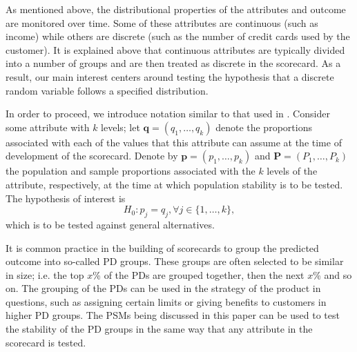 \documentclass{article}
\theoremstyle{def}
\begin{document}
As mentioned above, the distributional properties of the attributes and outcome are monitored over time. Some of these attributes are continuous (such as income) while others are discrete (such as the number of credit cards used by the customer). It is explained above that continuous attributes are typically divided into a number of groups and are then treated as discrete in the scorecard.
As a result, our main interest centers around testing the hypothesis that a discrete random variable follows a specified distribution.

In order to proceed, we introduce notation similar to that used in \cite{DUPISANIEVISAGIE2020}. Consider some attribute with $k$ levels; let $\mathbf{q}=(q_1,\dots,q_k)$ denote the proportions associated with each of the values that this attribute can assume at the time of development of the scorecard. Denote by $\mathbf{p}=(p_1,\dots,p_k)$ and $\mathbf{P}=(P_1,\dots,P_k)$ the population and sample proportions associated with the $k$ levels of the attribute, respectively, at the time at which population stability is to be tested. The hypothesis of interest is
\begin{equation}\label{eqn:H0}
    H_0: p_j=q_j, \forall j \in \{1,\dots,k\},
\end{equation}
which is to be tested against general alternatives.

It is common practice in the building of scorecards to group the predicted outcome into so-called PD groups. These groups are often selected to be similar in size; i.e. the top $x$\% of the PDs are grouped together, then the next $x$\% and so on. The grouping of the PDs can be used in the strategy of the product in questions, such as assigning certain limits or giving benefits to customers in higher PD groups. The PSMs being discussed in this paper can be used to test the stability of the PD groups in the same way that any attribute in the scorecard is tested.
\end{document}
